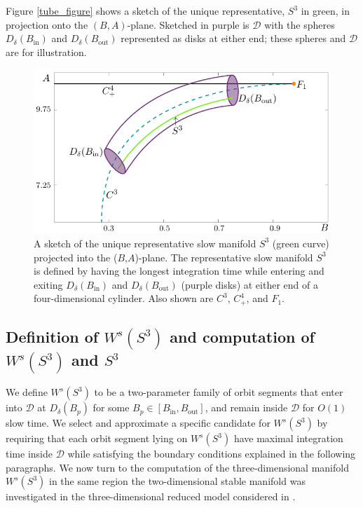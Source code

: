 \documentclass{ws-ijbc}
\begin{document}
Figure \ref{tube_figure} shows a sketch of the unique representative, $S^3$ in green, in projection onto the $(B,A)$-plane.  Sketched in purple is $\mathscr{D}$ with the spheres $D_\delta(B_{\mathrm{in}})$ and $D_\delta(B_{\mathrm{out}})$ represented as disks at either end; these spheres and $\mathscr{D}$ are for illustration.

\begin{figure}[!t]
\begin{center}
\includegraphics{./figures/MKMO_2.pdf}
\end{center}
\caption{A sketch of the unique representative slow manifold $S^3$ (green curve) projected into the ($B$,$A$)-plane.  The representative slow manifold $S^3$ is defined by having the longest integration time while entering and exiting  $D_\delta(B_{\mathrm{in}})$ and $D_\delta(B_{\mathrm{out}})$ (purple disks) at either end of a four-dimensional cylinder.  Also shown are $C^3$, $C^4_+$, and $F_1$.}
\label{MKMO_2}
\end{figure}

\subsection{Definition of $W^{s}(S^3)$ and computation of $W^{s}(S^3)$ and  $S^3$}

We define $W^{s}(S^3)$ to be a two-parameter family of orbit segments that enter into $\mathscr{D}$ at $D_{\delta}(B_p)$ for some $B_p \in [B_{\text{in}}, B_{\text{out}}]$, and remain inside $\mathscr{D}$ for $O(1)$ slow time.  We select and approximate a specific candidate for $W^{s}(S^3)$ by requiring that each orbit segment lying on $W^{s}(S^3)$ have maximal integration time inside $\mathscr{D}$ while satisfying the boundary conditions explained in the following paragraphs.  We now turn to the computation of the three-dimensional manifold $W^{s}(S^3)$ in the same region the two-dimensional stable manifold was investigated in the three-dimensional reduced model considered in \cite{QSSA}.
     
\end{document}
